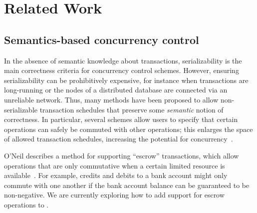 \section{Related Work}
\label{sec:relwork}


\subsection{Semantics-based concurrency control}
In the absence of semantic knowledge about transactions, serializability is the
main correctness criteria for concurrency control schemes. However, ensuring
serializability can be prohibitively expensive, for instance when transactions
are long-running or the nodes of a distributed database are connected via an
unreliable network. Thus, many methods have been proposed to allow
non-serializable transaction schedules that preserve some \emph{semantic} notion
of correctness. In particular, several schemes allow users to specify that
certain operations can safely be commuted with other operations; this enlarges
the space of allowed transaction schedules, increasing the potential for
concurrency~\cite{Farrag1989,Garcia-Molina1983,Weihl1988}.


O'Neil describes a method for supporting ``escrow'' transactions, which allow
operations that are only commutative when a certain limited resource is
available~\cite{O'Neil1986}. For example, credits and debits to a bank account
might only commute with one another if the bank account balance can be
guaranteed to be non-negative. We are currently exploring how to add support for
escrow operations to \lang.


